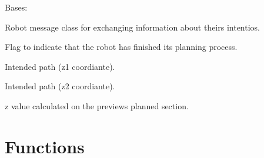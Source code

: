\documentclass[letterpaper,10pt,english]{sphinxmanual}
\begin{document}
\begin{fulllineitems}
\label{Multi-robot motion planner:planning_sim.RobotMsg}
Bases: \href{http://docs.python.org/library/functions.html\#object}{}

Robot message class for exchanging information about theirs intentios.

\begin{fulllineitems}
\label{Multi-robot motion planner:planning_sim.RobotMsg.done_planning}
Flag to indicate that the robot has finished its planning process.

\end{fulllineitems}


\begin{fulllineitems}
\label{Multi-robot motion planner:planning_sim.RobotMsg.intended_path_z1}
Intended path (z1 coordiante).

\end{fulllineitems}


\begin{fulllineitems}
\label{Multi-robot motion planner:planning_sim.RobotMsg.intended_path_z2}
Intended path (z2 coordiante).

\end{fulllineitems}


\begin{fulllineitems}
\label{Multi-robot motion planner:planning_sim.RobotMsg.latest_z}
z value calculated on the previews planned section.

\end{fulllineitems}


\end{fulllineitems}



\section{Functions}
\label{Multi-robot motion planner:functions}
\begin{DUlineblock}{0em}
\item[] 
\end{DUlineblock}
\end{document}

